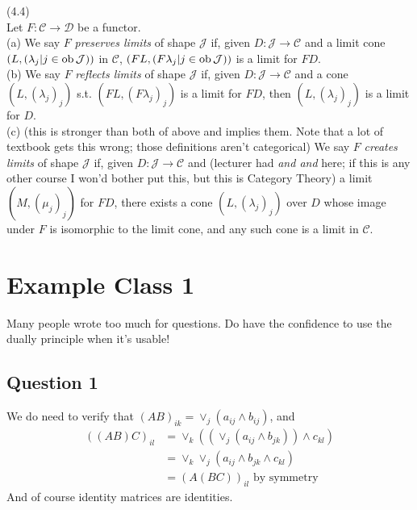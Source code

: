\documentclass[a4paper]{article}
\begin{document}
\begin{defi} (4.4)\\
    Let $F: \mathcal{C} \to \mathcal{D}$ be a functor.\\
    (a) We say $F$ \emph{preserves limits} of shape $\mathcal{J}$ if, given $D:\mathcal{J} \to \mathcal{C}$ and a limit cone $(L,(\lambda_j|j \in \operatorname{ob}\mathcal{J}))$ in $\mathcal{C}$, $(FL, (F\lambda_j | j \in \operatorname{ob} \mathcal{J}))$ is a limit for $FD$.\\
    (b) We say $F$ \emph{reflects limits} of shape $\mathcal{J}$ if, given $D:\mathcal{J} \to \mathcal{C}$ and a cone $(L,(\lambda_j)_j)$ s.t. $(FL,(F\lambda_j)_j)$ is a limit for $FD$, then $(L,(\lambda_j)_j)$ is a limit for $D$.\\
    (c) (this is stronger than both of above and implies them. Note that a lot of textbook gets this wrong; those definitions aren't categorical) We say $F$ \emph{creates limits} of shape $\mathcal{J}$ if, given $D : \mathcal{J} \to \mathcal{C}$ and (lecturer had \emph{and and} here; if this is any other course I won'd bother put this, but this is Category Theory) a limit $(M,(\mu_j)_j)$ for $FD$, there exists a cone $(L,(\lambda_j)_j)$ over $D$ whose image under $F$ is isomorphic to the limit cone, and any such cone is a limit in $\mathcal{C}$.
\end{defi}

\newpage

\section{Example Class 1}
Many people wrote too much for questions. Do have the confidence to use the dually principle when it's usable!

\subsection{Question 1}
We do need to verify that $(AB)_{ik} = \vee_j (a_{ij} \wedge b_{ij})$, and 
\begin{equation*}
    \begin{aligned}
        ((AB)C)_{il} &= \vee_k ((\vee_j (a_{ij} \wedge b_{jk} )) \wedge c_{kl})\\
        &= \vee_k \vee_j (a_{ij} \wedge b_{jk} \wedge c_{kl})\\
        &= (A(BC))_{il} \text{ by symmetry}
    \end{aligned}
\end{equation*}
And of course identity matrices are identities.
\end{document}
